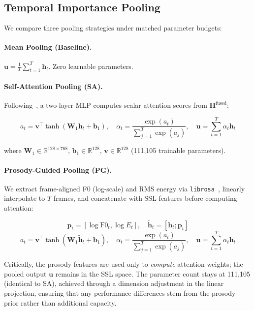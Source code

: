 \documentclass[11pt,a4paper]{article}
\begin{document}
\subsection{Temporal Importance Pooling}
\label{ssec:pooling}

We compare three pooling strategies under matched parameter budgets:

\paragraph{Mean Pooling (Baseline).}
$\mathbf{u} = \frac{1}{T}\sum_{t=1}^{T} \mathbf{h}_t$. Zero learnable
parameters.

\paragraph{Self-Attention Pooling (SA).}
Following~\cite{lin2017structured}, a two-layer MLP computes scalar attention
scores from $\mathbf{H}^{\text{fused}}$:

\begin{equation}
a_t = \mathbf{v}^\top \tanh(\mathbf{W}_1 \mathbf{h}_t + \mathbf{b}_1), \quad
\alpha_t = \frac{\exp(a_t)}{\sum_{j=1}^{T} \exp(a_j)}, \quad
\mathbf{u} = \sum_{t=1}^{T} \alpha_t \mathbf{h}_t
\end{equation}

where $\mathbf{W}_1 \in \mathbb{R}^{128 \times 768}$,
$\mathbf{b}_1 \in \mathbb{R}^{128}$, $\mathbf{v} \in \mathbb{R}^{128}$
(111,105 trainable parameters).

\paragraph{Prosody-Guided Pooling (PG).}
We extract frame-aligned F0 (log-scale) and RMS energy via
\texttt{librosa}~\cite{mcfee2015librosa}, linearly interpolate to $T$ frames,
and concatenate with SSL features before computing attention:

\begin{equation}
\mathbf{p}_t = [\log\text{F0}_t, \log E_t], \quad
\tilde{\mathbf{h}}_t = [\mathbf{h}_t; \mathbf{p}_t]
\end{equation}
\begin{equation}
a_t = \mathbf{v}^\top \tanh(\mathbf{W}_1 \tilde{\mathbf{h}}_t + \mathbf{b}_1), \quad
\alpha_t = \frac{\exp(a_t)}{\sum_{j=1}^{T} \exp(a_j)}, \quad
\mathbf{u} = \sum_{t=1}^{T} \alpha_t \mathbf{h}_t
\end{equation}

Critically, the prosody features are used only to \textit{compute} attention
weights; the pooled output $\mathbf{u}$ remains in the SSL space. The
parameter count stays at 111,105 (identical to SA), achieved through a
dimension adjustment in the linear projection, ensuring that any performance
differences stem from the prosody prior rather than additional capacity.
\end{document}
